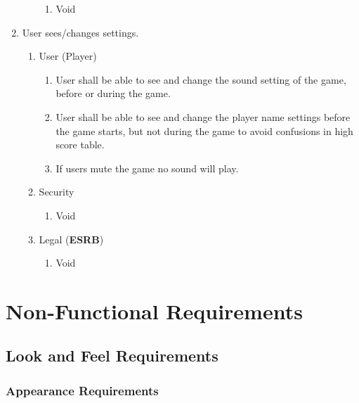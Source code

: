 \documentclass[]{article}
\begin{document}
\begin{enumerate}[{BE}1.]
\begin{enumerate}[{VP4}.1]
			\begin{enumerate}
				\item Void
			\end{enumerate}
	\end{enumerate}
	\item User sees/changes settings.
	\begin{enumerate}[{VP5}.1]
		\item User (Player)
			\begin{enumerate}
				\item User shall be able to see and change the sound setting of the game, before or during the game. 
				\item User shall be able to see and change the player name settings before the game starts, but not during the game to avoid confusions in high score table.
				\item If users mute the game no sound will play.
			\end{enumerate}
		\item Security
			\begin{enumerate}
				\item Void
			\end{enumerate}
		\item Legal (\textbf{ESRB})
			\begin{enumerate}
				\item Void
			\end{enumerate}
	\end{enumerate}
\end{enumerate}




\section{Non-Functional Requirements}
\label{sec:non-functional_requirements}
\subsection{Look and Feel Requirements}
\label{sub:look_and_feel_requirements}

\subsubsection{Appearance Requirements}
\label{ssub:appearance_requirements}
\end{document}
